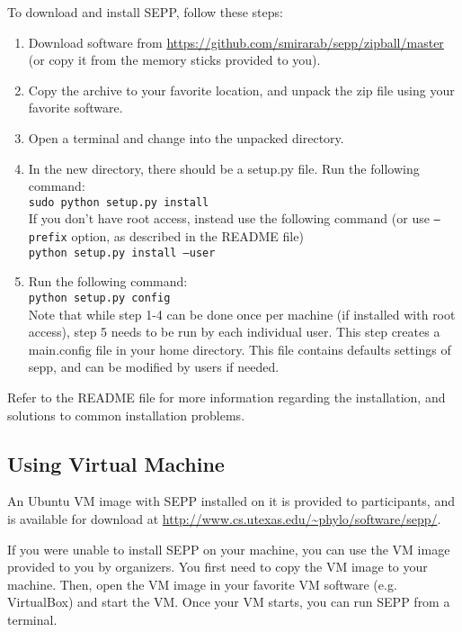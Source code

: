 \documentclass[11pt]{article} %
\newcommand{\sepp}{SEPP\xspace}
\newcommand{\ins}[1]{{\tt #1}}
\newcommand{\file}[1]{{\sf #1}}
\begin{document}
To download and install \sepp, follow these steps:

\begin{enumerate}
\item Download software from \url{https://github.com/smirarab/sepp/zipball/master} (or copy it from the memory sticks provided to you). 
\item Copy the archive to your favorite location, and unpack the zip file using your favorite software. 
\item Open a terminal and change into the unpacked directory. 
\item In the new directory, there should be a \file{setup.py} file. Run the following command:\\

\ins{sudo python setup.py install}\\

If you don't have root access, instead use the following command (or use \ins{--prefix} option, as described in the \file{README} file)\\

\ins{python setup.py install --user}

\item Run the following command:\\

\ins{python setup.py config}\\

Note that while step 1-4 can be done once per machine (if installed with root access), step 5 needs to be run by each individual user.
This step creates a \file{main.config} file in your home directory. This file contains defaults settings of sepp, and can be modified by users if needed.

\end{enumerate}
Refer to the README file for more information regarding the installation, and solutions to common installation problems. 

\subsection{Using Virtual Machine}
An Ubuntu VM image with \sepp installed on it is provided to participants, and is available for download at \url{http://www.cs.utexas.edu/~phylo/software/sepp/}.  

If you were unable to install \sepp on your machine, you can use the VM image provided to you by organizers. You first need to copy the VM image to your machine. Then, open the VM image in your favorite VM software (e.g. VirtualBox) and start the VM. Once your VM starts, you can run \sepp from a terminal.
\end{document}
